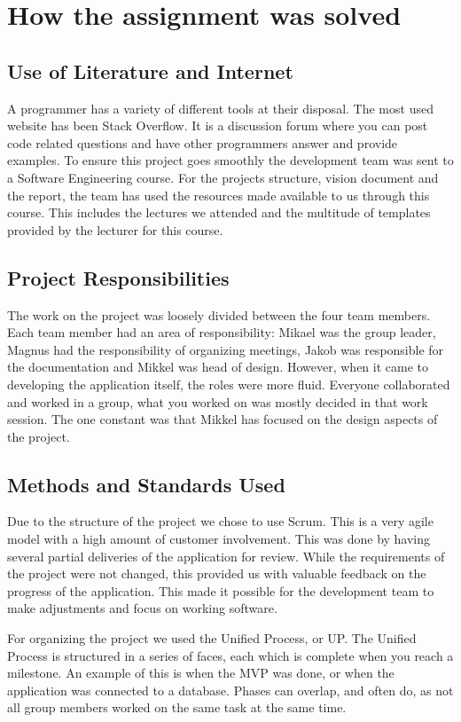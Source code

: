 \section{How the assignment was solved}
\subsection{Use of Literature and Internet}
A programmer has a variety of different tools at their disposal. The most used website has been Stack Overflow. It is a discussion forum where you can post code related questions and have other programmers answer and provide examples. \cite{website:Stackoverflow} To ensure this project goes smoothly the development team was sent to a Software Engineering course. For the projects structure, vision document and the report, the team has used the resources made available to us through this course. This includes the lectures we attended and the multitude of templates provided by the lecturer for this course. 

\subsection{Project Responsibilities}
The work on the project was loosely divided between the four team members. Each team member had an area of responsibility: Mikael was the group leader, Magnus had the responsibility of organizing meetings, Jakob was responsible for the documentation and Mikkel was head of design. However, when it came to developing the application itself, the roles were more fluid. Everyone collaborated and worked in a group, what you worked on was mostly decided in that work session. The one constant was that Mikkel has focused on the design aspects of the project.

\subsection{Methods and Standards Used}
Due to the structure of the project we chose to use Scrum. This is a very agile model with a high  amount of customer involvement. This was done by having several partial deliveries of the application for review. While the requirements of the project were not changed, this provided us with valuable feedback on the progress of the application. This made it possible for the development team to make adjustments and focus on working software. 

For organizing the project we used the Unified Process, or UP. The Unified Process is structured in a series of faces, each which is complete when you reach a milestone. An example of this is when the MVP was done, or when the application was connected to a database. Phases can overlap, and often do, as not all group members worked on the same task at the same time.


